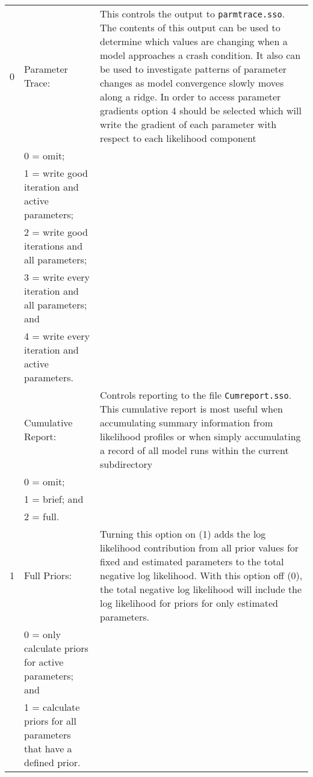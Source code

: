 {\begin{landscape}
\begin{longtable}{p{1.5cm} p{7.2cm} p{12.3cm}}
 \hline
 0 & Parameter Trace: & \multirow{1}{1cm}[-0.25cm]{\parbox{12.5cm}{This controls the output to \texttt{parmtrace.sso}. The contents of this output can be used to determine which values are changing when a model approaches a crash condition. It also can be used to investigate patterns of parameter changes as model convergence slowly moves along a ridge. In order to access parameter gradients option 4 should be selected which will write the gradient of each parameter with respect to each likelihood component}} \Tstrut\\
   & 0 = omit; & \\
   & 1 = write good iteration and active parameters; & \\
   & 2 = write good iterations and all parameters; & \\
   & 3 = write every iteration and all parameters; and & \\
   & 4 = write every iteration and active parameters. & \Bstrut\\
 \hline
 
 \pagebreak
 1 & Cumulative Report: & \multirow{1}{1cm}[-0.25cm]{\parbox{12.5cm}{Controls reporting to the file \texttt{Cumreport.sso}. This cumulative report is most useful when accumulating summary information from likelihood profiles or when simply accumulating a record of all model runs within the current subdirectory}} \Tstrut\\
   & 0 = omit;  & \\
   & 1 = brief; and & \\
   & 2 = full. & \Bstrut\\
	 
 \hline
 1 & Full Priors: & \multirow{1}{1cm}[-0.25cm]{\parbox{12.5cm}{Turning this option on (1) adds the log likelihood contribution from all prior values for fixed and estimated parameters to the total negative log likelihood. With this option off (0), the total negative log likelihood will include the log likelihood for priors for only estimated parameters.}} \Tstrut\\
   & 0 = only calculate priors for active parameters; and &	\\
   & 1 = calculate priors for all parameters that have a defined prior. & \Bstrut\\
	     

\end{longtable}
\end{landscape}}
